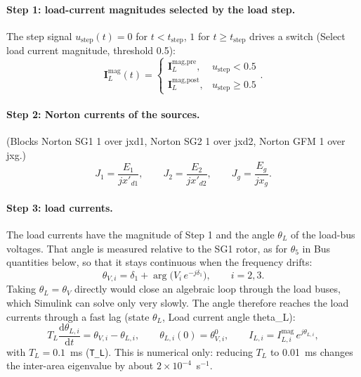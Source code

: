 \documentclass[11pt,a4paper]{article}
\numberwithin{equation}{section}
\newcommand{\dd}{\mathrm{d}}
\newcommand{\blk}[1]{\textsf{#1}}
\begin{document}
\paragraph{Step 1: load-current magnitudes selected by the load step.}
The step signal $u_{\text{step}}(t) = 0$ for $t<t_{\text{step}}$, $1$ for $t\ge t_{\text{step}}$ drives a switch (\blk{Select load current magnitude}, threshold 0.5):
\begin{equation}
\bm I_L^{\text{mag}}(t) = \begin{cases}\bm I_L^{\text{mag,pre}}, & u_{\text{step}}<0.5\\ \bm I_L^{\text{mag,post}}, & u_{\text{step}}\ge 0.5\end{cases}.
\end{equation}

\paragraph{Step 2: Norton currents of the sources.}
(Blocks \blk{Norton SG1 1 over jxd1}, \blk{Norton SG2 1 over jxd2}, \blk{Norton GFM 1 over jxg}.)
\begin{equation}
J_1 = \frac{E_1}{jx'_{d1}},\qquad J_2 = \frac{E_2}{jx'_{d2}},\qquad J_g = \frac{E_g}{jx_g}.
\end{equation}

\paragraph{Step 3: load currents.}
The load currents have the magnitude of Step 1 and the angle $\theta_L$ of the load-bus voltages. That angle is measured relative to the SG1 rotor, as for $\theta_5$ in \blk{Bus quantities} below, so that it stays continuous when the frequency drifts:
\begin{equation}
\theta_{V,i} = \delta_1 + \arg\!\big(V_i\,e^{-j\delta_1}\big),\qquad i = 2,3 .
\end{equation}
Taking $\theta_L = \theta_V$ directly would close an algebraic loop through the load buses, which Simulink can solve only very slowly. The angle therefore reaches the load currents through a fast lag (state $\theta_L$, \blk{Load current angle theta\_L}):
\begin{equation}
\boxed{T_L\frac{\dd\theta_{L,i}}{\dd t} = \theta_{V,i} - \theta_{L,i},\qquad \theta_{L,i}(0) = \theta_{V,i}^0,\qquad
I_{L,i} = I_{L,i}^{\text{mag}}\,e^{j\theta_{L,i}},}
\end{equation}
with $T_L = 0.1$~ms (\texttt{T\_L}). This is numerical only: reducing $T_L$ to 0.01~ms changes the inter-area eigenvalue by about $2\times10^{-4}$~s$^{-1}$.
\end{document}
